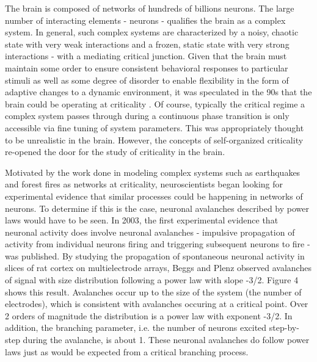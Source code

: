 \documentclass[12pt]{article}
\begin{document}
The brain is composed of networks of hundreds of billions neurons. The large number of interacting elements - neurons - qualifies the brain as a complex system. In general, such complex systems are characterized by a noisy, chaotic state with very weak interactions and a frozen, static state with very strong interactions - with a mediating critical junction. Given that the brain must maintain some order to ensure consistent behavioral responses to particular stimuli as well as some degree of disorder to enable flexibility in the form of adaptive changes to a dynamic environment, it was speculated in the 90s that the brain could be operating at criticality \cite{Bak1987a}. Of course, typically the critical regime a complex system passes through during a continuous phase transition is only accessible via fine tuning of system parameters. This was appropriately  thought to be unrealistic in the brain. However, the concepts of self-organized criticality re-opened the door for the study of criticality in the brain.

Motivated by the work done in modeling complex systems such as earthquakes and forest fires as networks at criticality, neuroscientists began looking for experimental evidence that similar processes could be happening in networks of neurons. To determine if this is the case, neuronal avalanches described by power laws would have to be seen. In 2003, the first experimental evidence that neuronal activity does involve neuronal avalanches - impulsive propagation of activity from individual neurons firing and triggering subsequent neurons to fire - was published\cite{Beggs2003b}. By studying the propagation of spontaneous neuronal activity in slices of rat cortex on multielectrode arrays, Beggs and Plenz observed avalanches of signal with size distribution following a power law with slope -3/2. Figure 4 shows this result. Avalanches occur up to the size of the system (the number of electrodes), which is consistent with avalanches occuring at a critical point. Over 2 orders of magnitude the distribution is a power law with exponent -3/2. In addition, the branching parameter, i.e. the number of neurons excited step-by-step during the avalanche, is about 1. These neuronal avalanches do follow power laws just as would be expected from a critical branching process. 
 
\end{document}
